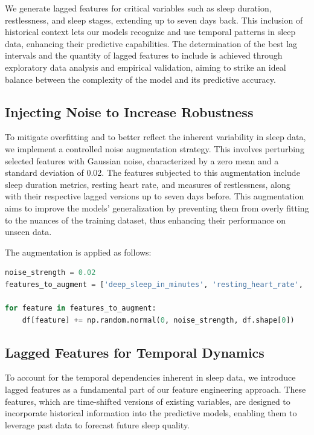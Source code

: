 \documentclass[10pt]{extarticle}
\begin{document}
We generate lagged features for critical variables such as sleep duration, restlessness, and sleep stages, extending up to seven days back. This inclusion of historical context lets our models recognize and use temporal patterns in sleep data, enhancing their predictive capabilities. The determination of the best lag intervals and the quantity of lagged features to include is achieved through exploratory data analysis and empirical validation, aiming to strike an ideal balance between the complexity of the model and its predictive accuracy.

\subsection{Injecting Noise to Increase Robustness}

To mitigate overfitting and to better reflect the inherent variability in sleep data, we implement a controlled noise augmentation strategy. This involves perturbing selected features with Gaussian noise, characterized by a zero mean and a standard deviation of 0.02. The features subjected to this augmentation include sleep duration metrics, resting heart rate, and measures of restlessness, along with their respective lagged versions up to seven days before. This augmentation aims to improve the models' generalization by preventing them from overly fitting to the nuances of the training dataset, thus enhancing their performance on unseen data.

The augmentation is applied as follows:
\begin{lstlisting}[language=Python]
noise_strength = 0.02
features_to_augment = ['deep_sleep_in_minutes', 'resting_heart_rate', 'restlessness'] + [f'deep_sleep_in_minutes_lag{lag}' for lag in range(1, 8)] + [f'restlessness_lag{lag}' for lag in range(1, 8)]

for feature in features_to_augment:
    df[feature] += np.random.normal(0, noise_strength, df.shape[0])
\end{lstlisting}

\subsection{Lagged Features for Temporal Dynamics}

To account for the temporal dependencies inherent in sleep data, we introduce lagged features as a fundamental part of our feature engineering approach. These features, which are time-shifted versions of existing variables, are designed to incorporate historical information into the predictive models, enabling them to leverage past data to forecast future sleep quality.
\end{document}
